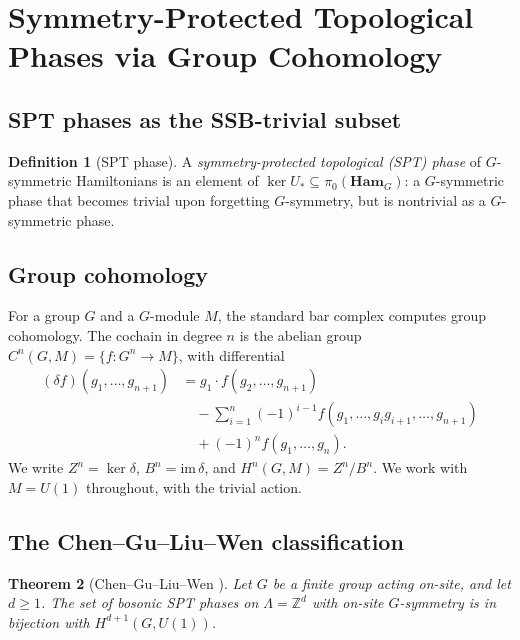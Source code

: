 \documentclass[12pt]{article}
\theoremstyle{plain}
\newtheorem{theorem}{Theorem}[section]
\theoremstyle{definition}
\newtheorem{definition}[theorem]{Definition}
\theoremstyle{remark}
\newcommand{\Ham}{\mathbf{Ham}}
\begin{document}
\section{Symmetry-Protected Topological Phases via Group Cohomology}
\label{sec:spt}

\subsection{SPT phases as the SSB-trivial subset}

\begin{definition}[SPT phase]
\label{def:spt}
A \emph{symmetry-protected topological (SPT) phase} of $G$-symmetric Hamiltonians is an
element of $\ker U_{*}\subseteq\pi_{0}(\Ham_{G})$: a $G$-symmetric phase that becomes
trivial upon forgetting $G$-symmetry, but is nontrivial as a $G$-symmetric phase.
\end{definition}

\subsection{Group cohomology}

For a group $G$ and a $G$-module $M$, the standard bar complex computes group
cohomology. The cochain in degree $n$ is the abelian group
$C^{n}(G,M)=\{f:G^{n}\to M\}$, with differential
\begin{align*}
(\delta f)(g_{1},\ldots,g_{n+1}) &= g_{1}\!\cdot f(g_{2},\ldots,g_{n+1}) \\
  &\quad - \sum_{i=1}^{n}(-1)^{i-1} f(g_{1},\ldots,g_{i}g_{i+1},\ldots,g_{n+1}) \\
  &\quad +(-1)^{n}f(g_{1},\ldots,g_{n}).
\end{align*}
We write
$Z^{n}=\ker\delta$, $B^{n}=\mathrm{im}\,\delta$, and
$H^{n}(G,M)=Z^{n}/B^{n}$. We work with $M=U(1)$ throughout, with the trivial action.

\subsection{The Chen--Gu--Liu--Wen classification}

\begin{theorem}[Chen--Gu--Liu--Wen \cite{ChenGuLiuWen2013}]
\label{thm:CGLW}
Let $G$ be a finite group acting on-site, and let $d\geq 1$. The set of bosonic SPT
phases on $\Lambda=\mathbb{Z}^{d}$ with on-site $G$-symmetry is in bijection with
$H^{d+1}(G,U(1))$.
\end{theorem}
\end{document}
